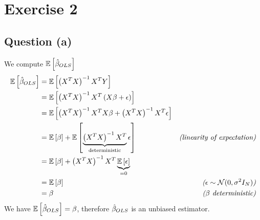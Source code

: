 \documentclass[12pt]{article}
\begin{document}
\section{Exercise 2} %
\subsection{Question (a)}
We compute \(\mathbb{E}\left[\hat \beta_{OLS}\right]\)
\begin{align*}
    \mathbb{E}\left[\hat \beta_{OLS}\right]
     & = \mathbb{E}\left[ \left( X^T X \right)^{-1}X^T Y \right]                                                                                                                                 \\
     & = \mathbb{E}\left[ \left( X^T X \right)^{-1}X^T \left(X\beta + \epsilon\right) \right]                                                                                                    \\
     & = \mathbb{E}\left[ \left( X^T X \right)^{-1}X^T X \beta + \left( X^T X \right)^{-1}X^T \epsilon \right]                                                                                   \\
     & = \mathbb{E}\left[ \beta \right] + \mathbb{E}\left[ \underbrace{\left( X^T X \right)^{-1}X^T}_{\text{deterministic}} \epsilon \right] & \textit{(linearity of expectation)}                       \\
     & = \mathbb{E}\left[ \beta \right] + \left( X^T X \right)^{-1}X^T \underbrace{\mathbb{E}\left[  \epsilon \right]}_{=0}                                                                              \\
     & = \mathbb{E}\left[ \beta \right]                                                                                              & \textit{(\(\epsilon \sim \mathcal{N}(0, \sigma^2 I_N)\))} \\
     & = \beta                                                                                                               & \textit{(\(\beta\) deterministic)}                        \\
\end{align*}
We have \(\mathbb{E}\left[\hat \beta_{OLS}\right] = \beta\), therefore \(\hat \beta_{OLS}\) is an unbiased estimator.
\end{document}
